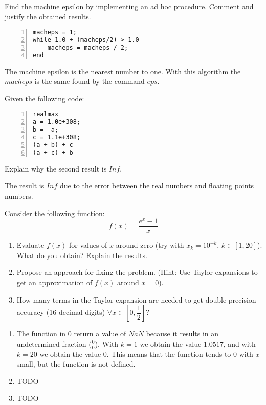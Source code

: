 \documentclass[12pt, a4paper]{report}
\newtheorem[style=M,bodystyle=\normalfont]{theorem}{Theorem}
\newtheorem[style=M,bodystyle=\normalfont]{corollary}{Corollary}
\newtheorem[style=M,bodystyle=\normalfont]{lemma}{Lemma}
\newtheorem[style=M,bodystyle=\normalfont]{definition}{Definition}
\begin{document}
    \newpage

    \begin{Exercise}[label=5]
        Find the machine epsilon by implementing an ad hoc procedure. Comment and justify the obtained results.
    \end{Exercise}
    \begin{Answer}[ref=5]
        \begin{lstlisting}[frame=single, numbers=left, style=Matlab-bw]
macheps = 1;
while 1.0 + (macheps/2) > 1.0
    macheps = macheps / 2;
end            
        \end{lstlisting}
        The machine epsilon is the nearest number to one. With this algorithm the $macheps$ is the same found by the command $eps$. 
    \end{Answer}

    \newpage

    \begin{Exercise}[label=6]
        Given the following code:
        \begin{lstlisting}[frame=single, numbers=left, style=Matlab-bw]
realmax
a = 1.0e+308;
b = -a;
c = 1.1e+308;
(a + b) + c
(a + c) + b  
        \end{lstlisting}
        Explain why the second result is $Inf$.
    \end{Exercise}
    \begin{Answer}[ref=6]
        The result is $Inf$ due to the error between the real numbers and floating points numbers.
    \end{Answer}

    \newpage

    \begin{Exercise}[label=7]
        Consider the following function:
        \[f(x)=\dfrac{e^x-1}{x}\]
        \begin{enumerate}
            \item Evaluate $f(x)$ for values of $x$ around zero (try with $x_k = 10^{-k}$, $k \in [1, 20]$). What do you obtain? Explain the results.
            \item Propose an approach for fixing the problem. (Hint: Use Taylor expansions to get an approximation of $f(x)$ around $x = 0$). 
            \item How many terms in the Taylor expansion are needed to get double precision accuracy (16 decimal digits) $\forall x \in \left[0, \dfrac{1}{2}\right]$?
        \end{enumerate}
    \end{Exercise}
    \begin{Answer}[ref=7]
        \begin{enumerate}
            \item The function in $0$ return a value of $NaN$ because it results in an undetermined fraction ($\frac{0}{0}$). 
                With $k=1$ we obtain the value $1.0517$, and with $k=20$ we obtain the value $0$. This means that the function tends to 
                $0$ with $x$ small, but the function is not defined. 
            \item TODO
            \item TODO
        \end{enumerate}
    \end{Answer}
\end{document}
